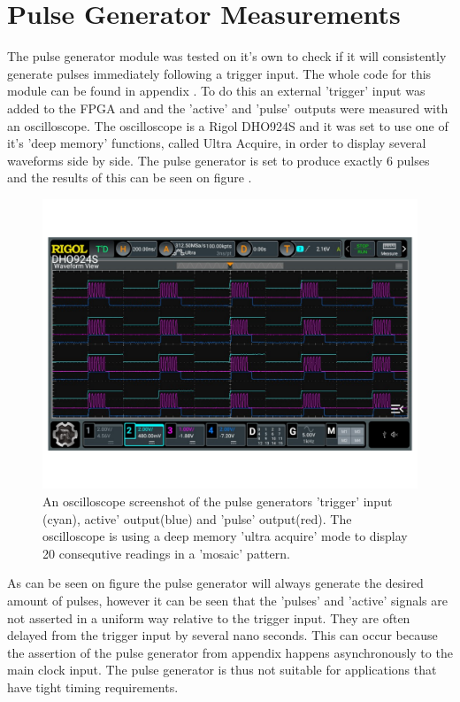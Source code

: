 \chapter{Pulse Generator Measurements} \label{App:PulseGenTest}
The pulse generator module was tested on it's own to check if it will consistently generate pulses immediately following a trigger input. The whole code for this module can be found in appendix . To do this an external 'trigger' input was added to the FPGA and and the 'active' and 'pulse' outputs were measured with an oscilloscope. The oscilloscope is a Rigol DHO924S and it was set to use one of it's 'deep memory' functions, called Ultra Acquire, in order to display several waveforms side by side. The pulse generator is set to produce exactly 6 pulses and the results of this can be seen on figure .

\begin{figure}[H]
    \centering
    \includegraphics[clip, trim=0 50 0 50, width=1\textwidth]{Appendix/Figures/A_PulseGen_Test.pdf}
    \caption{An oscilloscope screenshot of the pulse generators 'trigger' input (cyan), active' output(blue) and 'pulse' output(red). The oscilloscope is using a deep memory 'ultra acquire' mode to display 20 consequtive readings in a 'mosaic' pattern.}
    \label{fig:A_PulseGen_Test}
\end{figure}

As can be seen on figure  the pulse generator will always generate the desired amount of pulses, however it can be seen that the 'pulses' and 'active' signals are not asserted in a uniform way relative to the trigger input. They are often delayed from the trigger input by several nano seconds. This can occur because the assertion of the pulse generator from appendix  happens asynchronously to the main clock input. The pulse generator is thus not suitable for applications that have tight timing requirements. 